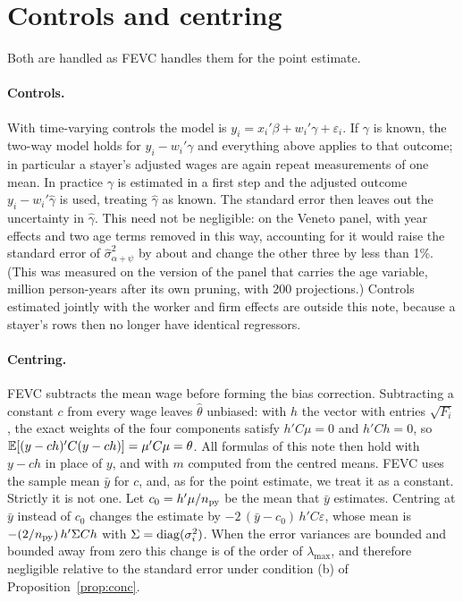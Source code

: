 \section{Controls and centring}\label{sec:controls}

Both are handled as FEVC handles them for the point estimate.

\paragraph{Controls.} With time-varying controls the model is $y_i=x_i'\beta+w_i'\gamma+\varepsilon_i$. If
$\gamma$ is known, the two-way model holds for $y_i-w_i'\gamma$ and everything above applies to that
outcome; in particular a stayer's adjusted wages are again repeat measurements of one mean. In practice
$\gamma$ is estimated in a first step and the adjusted outcome $y_i-w_i'\hat\gamma$ is used, treating
$\hat\gamma$ as known. The standard error then leaves out the uncertainty in $\hat\gamma$. This need not be
negligible: on the Veneto panel, with year effects and two age terms removed in this way, accounting for it
would raise the standard error of $\hat\sigma^2_{\alpha+\psi}$ by about  and change the other three
by less than 1\%. (This was measured on the version of the panel that carries the age variable,
 million person-years after its own pruning, with 200 projections.) Controls estimated jointly with the worker and firm effects are outside this
note, because a stayer's rows then no longer have identical regressors.

\paragraph{Centring.} FEVC subtracts the mean wage before forming the bias correction. Subtracting a constant
$c$ from every wage leaves $\hat\theta$ unbiased: with $h$ the vector with entries $\sqrt{F_i}$, the exact
weights of the four components satisfy $h'C\mu=0$ and $h'Ch=0$, so
$\mathbb{E}[(y-ch)'C(y-ch)]=\mu'C\mu=\theta$. All formulas of this note then hold with $y-ch$ in place of $y$, and
with $m$ computed from the centred means. FEVC uses the sample mean $\bar y$ for $c$, and, as for the point
estimate, we treat it as a constant. Strictly it is not one. Let $c_0=h'\mu/n_{\rm py}$ be the mean that $\bar y$ estimates. Centring at
$\bar y$ instead of $c_0$ changes the estimate by $-2\,(\bar y-c_0)\,h'C\varepsilon$, whose mean is
$-(2/n_{\rm py})\,h'\Sigma Ch$ with $\Sigma=\operatorname{diag}(\sigma_i^2)$. When the error variances are bounded and bounded
away from zero this change is of the order of $\lambda_{\max}$, and therefore negligible relative to the
standard error under condition (b) of Proposition~\ref{prop:conc}.
